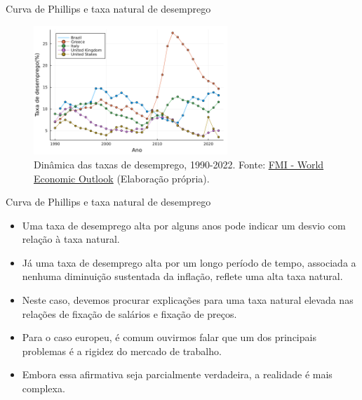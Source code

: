 \documentclass[10pt]{beamer}
\begin{document}
\begin{frame}{Curva de Phillips e taxa natural de desemprego}
    \begin{figure}
        \centering
        \includegraphics[width=0.65\textwidth]{./figures/macro14_fig3.png}
        \caption{Dinâmica das taxas de desemprego, 1990-2022. Fonte: \href{https://www.imf.org/en/Publications/SPROLLS/world-economic-outlook-databases\#sort=\%40imfdate\%20descending}{FMI - World Economic Outlook} (Elaboração própria).}
        \label{fig2}
    \end{figure}
\end{frame}

\begin{frame}{Curva de Phillips e taxa natural de desemprego}
    \begin{itemize}
        \item Uma taxa de desemprego alta por alguns anos pode indicar um desvio com relação à taxa natural.
        \bigskip
        \item Já uma taxa de desemprego alta por um longo período de tempo, associada a nenhuma diminuição sustentada da inflação, reflete uma alta taxa natural.
        \bigskip
        \item Neste caso, devemos procurar explicações para uma taxa natural elevada nas relações de fixação de salários e fixação de preços.
        \bigskip
        \item Para o caso europeu, é comum ouvirmos falar que um dos principais problemas é a rigidez do mercado de trabalho.
        \bigskip
        \item Embora essa afirmativa seja parcialmente verdadeira, a realidade é mais complexa.
    \end{itemize}
\end{frame}
\end{document}
